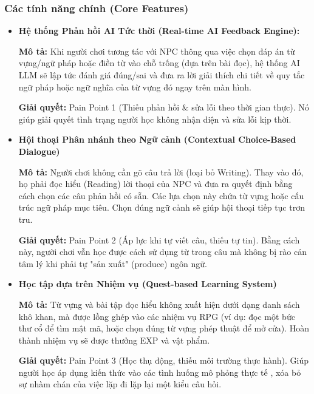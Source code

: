 \subsubsection{Các tính năng chính (Core Features)}
\begin{itemize}[label=-]
\item \textbf{Hệ thống Phản hồi AI Tức thời (Real-time AI Feedback Engine):} 

\hspace{0.5cm} \textbf{Mô tả:} Khi người chơi tương tác với NPC thông qua việc chọn đáp án từ vựng/ngữ pháp hoặc điền từ vào chỗ trống (dựa trên bài đọc), hệ thống AI LLM sẽ lập tức đánh giá đúng/sai và đưa ra lời giải thích chi tiết về quy tắc ngữ pháp hoặc ngữ nghĩa của từ vựng đó ngay trên màn hình.

\hspace{0.5cm} \textbf{Giải quyết:} Pain Point 1 (Thiếu phản hồi $\&$ sửa lỗi theo thời gian thực). Nó giúp giải quyết tình trạng người học không nhận diện và sửa lỗi kịp thời. 
\item \textbf{Hội thoại Phân nhánh theo Ngữ cảnh (Contextual Choice-Based Dialogue)} 

\hspace{0.5cm} \textbf{Mô tả:} Người chơi không cần gõ câu trả lời (loại bỏ Writing). Thay vào đó, họ phải đọc hiểu (Reading) lời thoại của NPC và đưa ra quyết định bằng cách chọn các câu phản hồi có sẵn. Các lựa chọn này chứa từ vựng hoặc cấu trúc ngữ pháp mục tiêu. Chọn đúng ngữ cảnh sẽ giúp hội thoại tiếp tục trơn tru.

\hspace{0.5cm} \textbf{Giải quyết:} Pain Point 2 (Áp lực khi tự viết câu, thiếu tự tin). Bằng cách này, người chơi vẫn học được cách sử dụng từ trong câu mà không bị rào cản tâm lý khi phải tự "sản xuất" (produce) ngôn ngữ.
\item \textbf{Học tập dựa trên Nhiệm vụ (Quest-based Learning System)}

\hspace{0.5cm} \textbf{Mô tả:} Từ vựng và bài tập đọc hiểu không xuất hiện dưới dạng danh sách khô khan, mà được lồng ghép vào các nhiệm vụ RPG (ví dụ: đọc một bức thư cổ để tìm mật mã, hoặc chọn đúng từ vựng phép thuật để mở cửa). Hoàn thành nhiệm vụ sẽ được thưởng EXP và vật phẩm.

\hspace{0.5cm} \textbf{Giải quyết:} Pain Point 3 (Học thụ động, thiếu môi trường thực hành). Giúp người học áp dụng kiến thức vào các tình huống mô phỏng thực tế , xóa bỏ sự nhàm chán của việc lặp đi lặp lại một kiểu câu hỏi.
\end{itemize}
